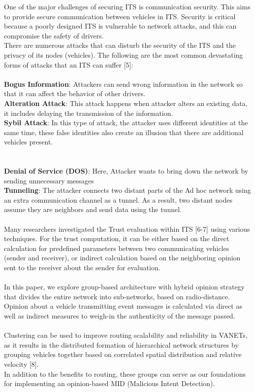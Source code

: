\documentclass[a4paper,14pt]{extarticle}
\begin{document}
One of the major challenges of securing ITS is communication security. This aims to provide secure communication between vehicles in ITS. Security is critical because a poorly designed ITS is vulnerable to network attacks, and this can compromise the safety of drivers.
\\
There are numerous attacks that can disturb the security of the ITS and the privacy of its nodes (vehicles). The following are the most common devastating forms of
attacks that an ITS can suffer [5]: 
\\ \\
\textbf{Bogus Information}: Attackers can send wrong information in the network so that it can affect the behavior of other
drivers.
\\
\textbf{Alteration Attack}: This attack happens when attacker alters an existing data, it includes delaying the transmission of the information.
\\
\textbf{Sybil Attack}: In this type of attack, the attacker uses different identities at the same time, these false identities also create an illusion that there are additional vehicles present.
\\ \\ \\
\textbf{Denial of Service (DOS)}: Here, Attacker wants to bring down the network by sending unnecessary messages 
\\
\textbf{Tunneling}: The attacker connects two distant parts of the Ad
hoc network using an extra communication channel as a tunnel. As a result, two distant nodes assume they are neighbors and send data using the tunnel.
\\ \\ 
Many researchers investigated the Trust evaluation within ITS [6-7] using various techniques. For the trust computation, it can be either based on the direct calculation for predefined parameters between two communicating vehicles (sender and receiver), or indirect calculation based on the neighboring opinion sent to the receiver about the sender for evaluation.
\\ \\ 
In this paper, we explore group-based architecture with hybrid opinion strategy that divides the entire network into sub-networks, based on radio-distance. Opinion about a vehicle transmitting event messages is calculated via direct as well as indirect measures to weigh-in the authenticity of the message passed.
\\ \\
Clustering can be used to improve routing scalability and reliability in VANETs, as it results in the distributed formation of hierarchical network structures by grouping vehicles together based on correlated spatial distribution and relative
velocity [8]. 
\\
In addition to the benefits to routing, these groups can serve as our foundations for implementing an opinion-based MID (Malicious Intent Detection).
\end{document}

